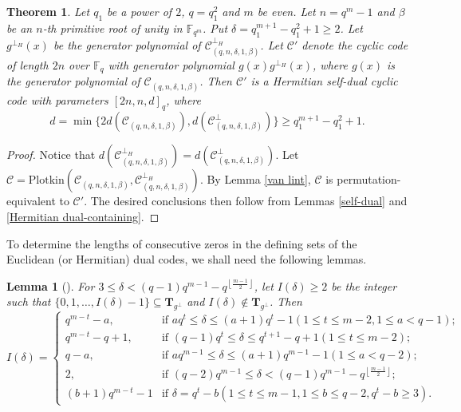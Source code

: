 \documentclass[10pt,a4paper]{amsart}
\newtheorem{theorem}{Theorem}
\newtheorem{lemma}{Lemma}
\begin{document}
\begin{theorem}
    \label{even Hermitian self-dual}
    Let $q_1$ be a power of $2$, $q=q_1^2$ and $m$ be even. Let $n=q^m-1$ and $\beta$ be an $n$-th primitive root of unity in $\mathbb{F}_{q^m}$. Put $\delta=q_1^{m+1}-q_1^2+1\ge 2$. Let $g^{\perp_H}(x)$ be the generator polynomial of $\mathcal{C}_{(q,n,\delta,1,\beta)}^{\perp_H}$. Let $\mathcal{C}'$ denote the cyclic code of length $2n$ over $\mathbb{F}_q$ with generator polynomial $g(x)g^{\perp_H}(x)$, where $g(x)$ is the generator polynomial of $\mathcal{C}_{(q,n,\delta,1,\beta)}$. Then $\mathcal{C}'$ is a Hermitian self-dual cyclic code with parameters $[2n,n,d]_q$, where \[d=\min\{2d(\mathcal{C}_{(q,n,\delta,1,\beta)}),d(\mathcal{C}_{(q,n,\delta,1,\beta)}^\perp)\}\ge q_1^{m+1}-q_1^2+1.\]
\end{theorem}
\begin{proof}
    Notice that $d(\mathcal{C}^{\perp_H}_{(q,n,\delta,1,\beta)})=d(\mathcal{C}^\perp_{(q,n,\delta,1,\beta)})$. Let $\mathcal{C}=\text{Plotkin}(\mathcal{C}_{(q,n,\delta,1,\beta)},\mathcal{C}^{\perp_H}_{(q,n,\delta,1,\beta)})$.
    By Lemma \ref{van lint}, $\mathcal{C}$ is permutation-equivalent to $\mathcal{C}'$. The desired conclusions then follow from Lemmas \ref{self-dual} and \ref{Hermitian dual-containing}.
\end{proof}

To determine the lengths of consecutive zeros in the defining sets of the Euclidean (or Hermitian) dual codes, we shall need the following lemmas.

\begin{lemma}[\cite{gong2022dual}]
    \label{Euclidean dual BCH}
    For $3 \leq \delta < (q-1)q^{m-1} - q^{\left\lfloor \frac{m-1}{2} \right\rfloor}$, let $I(\delta) \geq 2$ be the integer such that $\{0,1,\dots,I(\delta)-1\} \subseteq \textbf{T}_{g^\perp}$ and $I(\delta) \notin \textbf{T}_{g^\perp}$. Then
    \[
    I(\delta)=
    \begin{cases}
        q^{m-t}-a, & \text{if } aq^t \leq \delta \leq (a+1)q^t-1(1 \leq t \leq m-2,1 \leq a < q-1);\\
        q^{m-t}-q+1, & \text{if } (q-1)q^t \leq \delta \leq q^{t+1}-q+1(1 \leq t \leq m-2);\\
        q-a, & \text{if } aq^{m-1} \leq \delta \leq (a+1)q^{m-1}-1(1 \leq a < q-2);\\
        2, & \text{if } (q-2)q^{m-1} \leq \delta < (q-1)q^{m-1}-q^{\left\lfloor \frac{m-1}{2} \right\rfloor};\\
        (b+1)q^{m-t}-1 & \text{if } \delta=q^t-b(1 \leq t \leq m-1,1 \leq b \leq q-2, q^t-b \geq 3).
    \end{cases}
    \]
\end{lemma}
\end{document}
